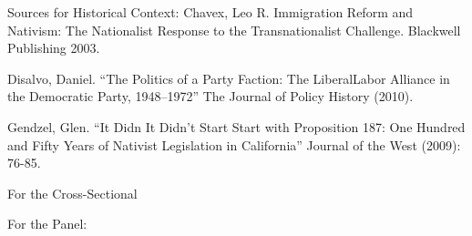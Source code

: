 \documentclass[12pt,letterpaper]{article}
\begin{document}
Sources for Historical Context:
Chavex, Leo R. Immigration Reform and Nativism: The Nationalist Response to the Transnationalist Challenge. Blackwell Publishing 2003.

Disalvo, Daniel. “The Politics of a Party Faction: The LiberalLabor Alliance in the Democratic Party,
1948–1972”  The Journal of Policy History (2010).

Gendzel, Glen. “It Didn It Didn’t Start Start with Proposition 187: One Hundred and Fifty Years of Nativist Legislation in California” Journal of the West (2009): 76-85.

For the Cross-Sectional
 
For the Panel:
 
\newpage	
\end{document}
